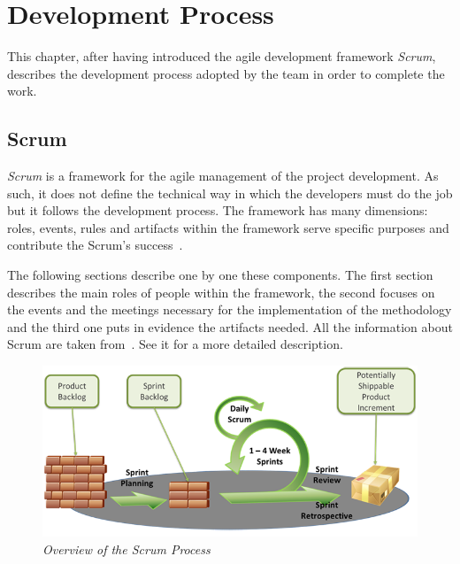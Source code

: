 \chapter{Development Process}
This chapter, after having introduced the agile development framework \emph{Scrum}, describes the development process adopted by the team in order to complete the work.

	\section{Scrum}\label{ref_scrum}
	\emph{Scrum} is a framework for the agile management of the project development. 
	As such, it does not define the technical way in which the developers must do the job but it follows the development process. 	
	The framework has many dimensions: roles, events, rules and artifacts within the framework serve specific purposes and contribute the Scrum's success~\cite{scrumEnglishGuide}.  

	The following sections describe one by one these components. The first section describes the main roles of people within the framework, the second focuses on the events and the meetings necessary for the implementation of the methodology and the third one puts in evidence the artifacts needed.
	All the information about Scrum are taken from~\cite{scrumEnglishGuide}. See it for a more detailed description.

	\begin{figure}[h]
	  \begin{center} 
	    \includegraphics[scale=0.45]{images/ch_04/scrum_overview.png}
	  \end{center} 
	  \caption{\textit{Overview of the Scrum Process}}  
	  \label{fig:ScrumOverview}
  	\end{figure}

